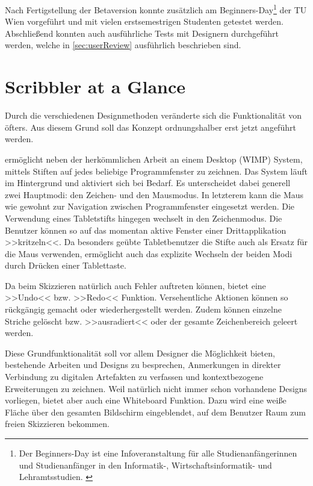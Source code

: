 \medskip Nach Fertigstellung der Betaversion konnte \scribbler zusätzlich am Beginners-Day\footnote{Der Beginners-Day ist eine Infoveranstaltung für alle Studienanfängerinnen und Studienanfänger in den Informatik-, Wirtschaftsinformatik- und Lehramtsstudien. \citep{TU:2010}} der TU Wien vorgeführt und mit vielen erstsemestrigen Studenten getestet werden. Abschließend konnten auch ausführliche Tests mit Designern durchgeführt werden, welche in \autoref{sec:userReview} ausführlich beschrieben sind.

\section{Scribbler at a Glance}
Durch die verschiedenen Designmethoden veränderte sich die Funktionalität von \scribbler öfters. Aus diesem Grund soll das Konzept ordnungshalber erst jetzt angeführt werden.

\medskip \scribbler ermöglicht neben der herkömmlichen Arbeit an einem Desktop (\acs{WIMP}) System, mittels Stiften auf jedes beliebige Programmfenster zu zeichnen. Das System läuft im Hintergrund und aktiviert sich bei Bedarf. Es unterscheidet dabei generell zwei Hauptmodi: den Zeichen- und den Mausmodus. In letzterem kann die Maus wie gewohnt zur Navigation zwischen Programmfenster eingesetzt werden. Die Verwendung eines Tabletstifts hingegen wechselt in den Zeichenmodus. Die Benutzer können so auf das momentan aktive Fenster einer Drittapplikation >>kritzeln<<. Da besonders geübte Tabletbenutzer die Stifte auch als Ersatz für die Maus verwenden, ermöglicht \scribbler auch das explizite Wechseln der beiden Modi durch Drücken einer Tablettaste.

\medskip Da beim Skizzieren natürlich auch Fehler auftreten können, bietet \scribbler eine >>Undo<< bzw. >>Redo<< Funktion. Versehentliche Aktionen können so rückgängig gemacht oder wiederhergestellt werden. Zudem können einzelne Striche gelöscht bzw. >>ausradiert<< oder der gesamte Zeichenbereich geleert werden.

\medskip Diese Grundfunktionalität soll vor allem Designer die Möglichkeit bieten, bestehende Arbeiten und Designs zu besprechen, Anmerkungen in direkter Verbindung zu digitalen Artefakten zu verfassen und kontextbezogene Erweiterungen zu zeichnen. Weil natürlich nicht immer schon vorhandene Designs vorliegen, bietet \scribbler aber auch eine Whiteboard Funktion. Dazu wird eine weiße Fläche über den gesamten Bildschirm eingeblendet, auf dem Benutzer Raum zum freien Skizzieren bekommen.

